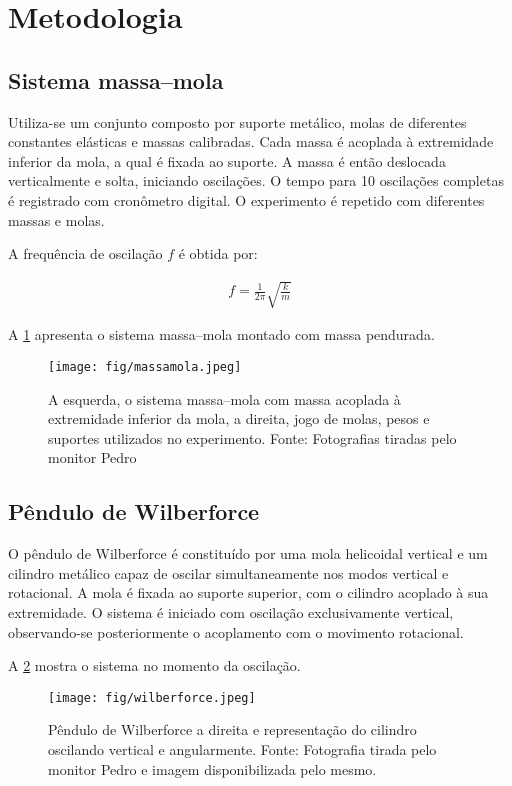 \section{Metodologia}

\subsection{Sistema massa–mola}

Utiliza-se um conjunto composto por suporte metálico, molas de diferentes constantes elásticas e massas calibradas. Cada massa é acoplada à extremidade inferior da mola, a qual é fixada ao suporte. A massa é então deslocada verticalmente e solta, iniciando oscilações. O tempo para 10 oscilações completas é registrado com cronômetro digital. O experimento é repetido com diferentes massas e molas.

A frequência de oscilação \(f\) é obtida por:

\begin{align*}
    f = \frac{1}{2\pi} \sqrt{\frac{k}{m}}
\end{align*}

A \cref{fig:massamola} apresenta o sistema massa–mola montado com massa pendurada.

\begin{figure}[H]
    \centering
    \texttt{[image: fig/massamola.jpeg]}
    \caption{A esquerda, o sistema massa–mola com massa acoplada à extremidade inferior da mola, a direita, jogo de molas, pesos e suportes utilizados no experimento. Fonte: Fotografias tiradas pelo monitor Pedro}
    \label{fig:massamola}
\end{figure}

\subsection{Pêndulo de Wilberforce}

O pêndulo de Wilberforce é constituído por uma mola helicoidal vertical e um cilindro metálico capaz de oscilar simultaneamente nos modos vertical e rotacional. A mola é fixada ao suporte superior, com o cilindro acoplado à sua extremidade. O sistema é iniciado com oscilação exclusivamente vertical, observando-se posteriormente o acoplamento com o movimento rotacional.

A \cref{fig:wilberforce} mostra o sistema no momento da oscilação.

\begin{figure}[H]
    \centering
    \texttt{[image: fig/wilberforce.jpeg]}
    \caption{Pêndulo de Wilberforce a direita e representação do cilindro oscilando vertical e angularmente. Fonte: Fotografia tirada pelo monitor Pedro e imagem disponibilizada pelo mesmo.}
    \label{fig:wilberforce}
\end{figure}

